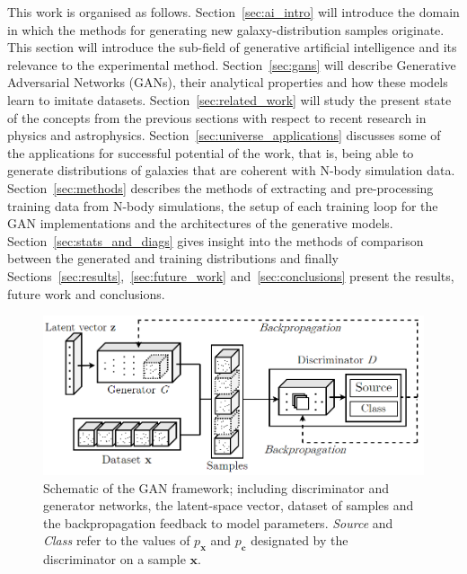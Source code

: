 \documentclass[twocolumn]{article}
\numberwithin{equation}{section}
\begin{document}
This work is organised as follows. Section~\ref{sec:ai_intro} will introduce the domain in which the methods for 
generating new galaxy-distribution samples originate. This section will introduce the sub-field of generative artificial 
intelligence and its relevance to the experimental method. Section~\ref{sec:gans} will describe Generative Adversarial 
Networks (GANs), their analytical properties and how these models learn to imitate datasets. Section~\ref{sec:related_work} 
will study the present state of the concepts from the previous sections with respect to recent research in physics and 
astrophysics. Section~\ref{sec:universe_applications} discusses some of the applications for successful potential of the 
work, that is, being able to generate distributions of galaxies that are coherent with N-body simulation data. 
Section~\ref{sec:methods} describes the methods of extracting and pre-processing training data from N-body simulations, 
the setup of each training loop for the GAN implementations and the architectures of the generative models. 
Section~\ref{sec:stats_and_diags} gives insight into the methods of comparison between the generated and training 
distributions and finally Sections~\ref{sec:results},~\ref{sec:future_work} and~\ref{sec:conclusions} present the results, 
future work and conclusions.


\begin{figure}
\includegraphics[width=\columnwidth]{figures/diagrams/ACGAN_diagram_box.png}
\centering
\caption{Schematic of the GAN framework; including discriminator and generator networks, the latent-space vector, dataset 
         of samples and the backpropagation feedback to model parameters. \textit{Source} and \textit{Class} refer to the
         values of $p_\mathbf{x}$ and $p_\mathbf{c}$ designated by the discriminator on a sample $\mathbf{x}$.}
\label{fig:GAN_diagram}
\end{figure}
\end{document}

